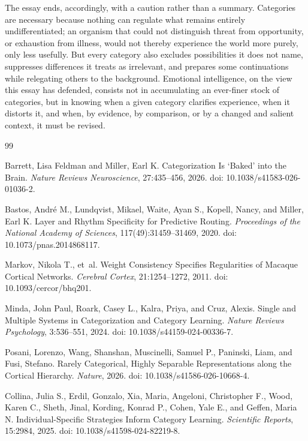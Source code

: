 \documentclass[11pt]{article}
\begin{document}
The essay ends, accordingly, with a caution rather than a summary. Categories are necessary because nothing can regulate what remains entirely undifferentiated; an organism that could not distinguish threat from opportunity, or exhaustion from illness, would not thereby experience the world more purely, only less usefully. But every category also excludes possibilities it does not name, suppresses differences it treats as irrelevant, and prepares some continuations while relegating others to the background. Emotional intelligence, on the view this essay has defended, consists not in accumulating an ever-finer stock of categories, but in knowing when a given category clarifies experience, when it distorts it, and when, by evidence, by comparison, or by a changed and salient context, it must be revised.

\begin{thebibliography}{99}

Barrett, Lisa Feldman and Miller, Earl K.
\newblock Categorization Is `Baked' into the Brain.
\newblock \emph{Nature Reviews Neuroscience}, 27:435--456, 2026.
\newblock doi: 10.1038/s41583-026-01036-2.

Bastos, Andr\'e M., Lundqvist, Mikael, Waite, Ayan S., Kopell, Nancy, and Miller, Earl K.
\newblock Layer and Rhythm Specificity for Predictive Routing.
\newblock \emph{Proceedings of the National Academy of Sciences}, 117(49):31459--31469, 2020.
\newblock doi: 10.1073/pnas.2014868117.

Markov, Nikola T., et~al.
\newblock Weight Consistency Specifies Regularities of Macaque Cortical Networks.
\newblock \emph{Cerebral Cortex}, 21:1254--1272, 2011.
\newblock doi: 10.1093/cercor/bhq201.

Minda, John Paul, Roark, Casey L., Kalra, Priya, and Cruz, Alexis.
\newblock Single and Multiple Systems in Categorization and Category Learning.
\newblock \emph{Nature Reviews Psychology}, 3:536--551, 2024.
\newblock doi: 10.1038/s44159-024-00336-7.

Posani, Lorenzo, Wang, Shanshan, Muscinelli, Samuel P., Paninski, Liam, and Fusi, Stefano.
\newblock Rarely Categorical, Highly Separable Representations along the Cortical Hierarchy.
\newblock \emph{Nature}, 2026.
\newblock doi: 10.1038/s41586-026-10668-4.

Collina, Julia S., Erdil, Gonzalo, Xia, Maria, Angeloni, Christopher F., Wood, Karen C., Sheth, Jinal, Kording, Konrad P., Cohen, Yale E., and Geffen, Maria N.
\newblock Individual-Specific Strategies Inform Category Learning.
\newblock \emph{Scientific Reports}, 15:2984, 2025.
\newblock doi: 10.1038/s41598-024-82219-8.


\end{thebibliography}
\end{document}
